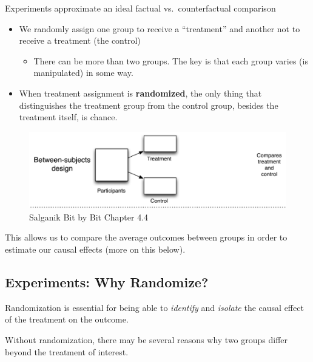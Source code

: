 \documentclass[
  letterpaper,
  DIV=11,
  numbers=noendperiod]{scrreprt}
\providecommand{\tightlist}{%
  \setlength{\itemsep}{0pt}\setlength{\parskip}{0pt}}\usepackage{longtable,booktabs,array}
\begin{document}
Experiments approximate an ideal factual vs.~counterfactual comparison

\begin{itemize}
\tightlist
\item
  We randomly assign one group to receive a ``treatment'' and another
  not to receive a treatment (the control)

  \begin{itemize}
  \tightlist
  \item
    There can be more than two groups. The key is that each group varies
    (is manipulated) in some way.
  \end{itemize}
\item
  When treatment assignment is \textbf{randomized}, the only thing that
  distinguishes the treatment group from the control group, besides the
  treatment itself, is chance.
\end{itemize}

\begin{figure}

{\centering \includegraphics{images/betweensub.png}

}

\caption{Salganik Bit by Bit Chapter 4.4}

\end{figure}

This allows us to compare the average outcomes between groups in order
to estimate our causal effects (more on this below).

\hypertarget{experiments-why-randomize}{%
\subsection{Experiments: Why
Randomize?}\label{experiments-why-randomize}}

Randomization is essential for being able to \emph{identify} and
\emph{isolate} the causal effect of the treatment on the outcome.

Without randomization, there may be several reasons why two groups
differ beyond the treatment of interest.
\end{document}
